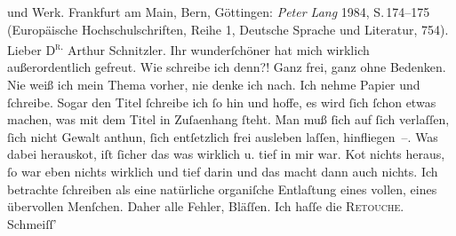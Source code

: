 \begin{ledgroupsized}[t]{13cm}
{{{                        und Werk}. Frankfurt am Main, Bern, Göttingen: \emph{Peter Lang} 1984, S. 174–175 (Europäische Hochschulschriften, Reihe 1, Deutsche Sprache und
                        Literatur, 754).}   }\toendnotes[C]{\smallbreak}\pstart{}{\pb}Lieber \textsc{D\textsuperscript{r.}} Arthur Schnitzler.\pend\pstart
           Ihr wunderſchöner \label{K_L00351-1v}\label{K_L00351-1h} hat mich wirklich
               außerordentlich gefreut. Wie schreibe ich denn?!\pend
           \pstart
           Ganz frei, ganz ohne Bedenken. Nie weiß ich mein Thema vorher, nie denke ich nach.
               Ich nehme Papier und ſchreibe. Sogar den Titel ſchreibe ich ſo hin und hoffe, es wird
               ſich ſchon etwas machen, was mit dem Titel in Zuſa{\geminationm}enhang ſteht.\pend
           \pstart
           Man muß ſich auf ſich verlaſſen, ſich nicht Gewalt anthun, ſich entſetzlich frei
               ausleben laſſen, hinfliegen –. {\pb}Was dabei herausko{\geminationm}t, iſt ſicher das was wirklich u. tief in mir war. Ko{\geminationm}t nichts heraus, ſo war eben nichts wirklich und tief
               darin und das macht dann auch nichts.\pend
           \pstart
           Ich betrachte ſchreiben als eine natürliche organiſche Entlaſtung eines vollen, eines
               übervollen Menſchen.\pend
           \pstart
           Daher alle \strikeout{\textcolor{gray}{meine}} Fehler, Bläſſen. Ich haſſe die \textsc{Retouche}. Schmeiſſ’

\end{ledgroupsized}
